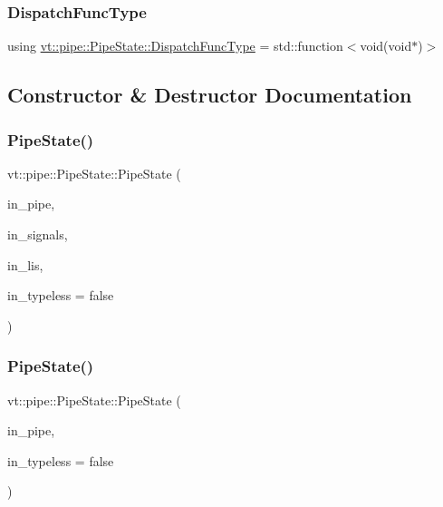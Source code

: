 \subsubsection{\texorpdfstring{Dispatch\+Func\+Type}{DispatchFuncType}}
{\footnotesize\ttfamily using \hyperlink{structvt_1_1pipe_1_1_pipe_state_ad81b637847d9c3185420c58c9272ed7d}{vt\+::pipe\+::\+Pipe\+State\+::\+Dispatch\+Func\+Type} =  std\+::function$<$void(void$\ast$)$>$}



\subsection{Constructor \& Destructor Documentation}
\mbox{\label{structvt_1_1pipe_1_1_pipe_state_ae243864cd9ea61ddc564b6b3a0870eb4}} 
\subsubsection{\texorpdfstring{Pipe\+State()}{PipeState()}\hspace{0.1cm}{\footnotesize\ttfamily [1/2]}}
{\footnotesize\ttfamily vt\+::pipe\+::\+Pipe\+State\+::\+Pipe\+State (\begin{DoxyParamCaption}\item[{\hyperlink{namespacevt_ac9852acda74d1896f48f406cd72c7bd3}{Pipe\+Type} const \&}]{in\+\_\+pipe,  }\item[{\hyperlink{namespacevt_ace18d74dd489d9ea506d38789fffce34}{Pipe\+Ref\+Type} const \&}]{in\+\_\+signals,  }\item[{\hyperlink{namespacevt_ace18d74dd489d9ea506d38789fffce34}{Pipe\+Ref\+Type} const \&}]{in\+\_\+lis,  }\item[{bool const \&}]{in\+\_\+typeless = {\ttfamily false} }\end{DoxyParamCaption})}

\mbox{\label{structvt_1_1pipe_1_1_pipe_state_a2f6a2a7f657b0938d0214fc16b65969c}} 
\subsubsection{\texorpdfstring{Pipe\+State()}{PipeState()}\hspace{0.1cm}{\footnotesize\ttfamily [2/2]}}
{\footnotesize\ttfamily vt\+::pipe\+::\+Pipe\+State\+::\+Pipe\+State (\begin{DoxyParamCaption}\item[{\hyperlink{namespacevt_ac9852acda74d1896f48f406cd72c7bd3}{Pipe\+Type} const \&}]{in\+\_\+pipe,  }\item[{bool const \&}]{in\+\_\+typeless = {\ttfamily false} }\end{DoxyParamCaption})}



